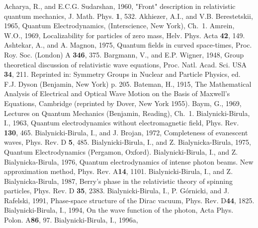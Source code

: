 \documentclass{article}
\begin{document}
\begin{thebibliography}{References}
 Acharya, R., and E.C.G.
Sudarshan, 1960, "Front" description in relativistic quantum mechanics, J.
Math. Phys. {\bf 1}, 532.
 Akhiezer, A.I., and V.B.
Berestetskii, 1965, Quantum Electrodynamics, (Interscience, New York),
Ch.~1.
 Amrein, W.O., 1969, Localizability for
particles of zero mass, Helv. Phys. Acta {\bf 42}, 149.
 Ashtekar, A., and A. Magnon,
1975, Quantum fields in curved space-times, Proc. Roy. Soc. (London) A{\bf
346}, 375.
 Bargmann, V., and E.P. Wigner,
1948, Group theoretical discussion of relativistic wave equations, Proc.
Natl. Acad. Sci. USA {\bf 34}, 211. Reprinted in: Symmetry Groups in Nuclear
and Particle Physics, ed. F.J. Dyson (Benjamin, New York) p. 205.
 Bateman, H., 1915, The Mathematical
Analysis of Electrical and Optical Wave Motion on the Basis of Maxwell's
Equations, Cambridge (reprinted by Dover, New York 1955).
 Baym, G., 1969, Lectures on Quantum
Mechanics (Benjamin, Reading), Ch.~1.
 Bialynicki-Birula, I., 1963,
Quantum electrodynamics without electromagnetic field, Phys. Rev. {\bf 130},
465.
 Bialynicki-Birula,
I., and J. Brojan, 1972, Completeness of evanescent waves, Phys. Rev. D{\bf
5}, 485.
Bialynicki-Birula, I., and Z. Bialynicka-Birula, 1975, Quantum
Electrodynamics (Pergamon, Oxford).
Bialynicki-Birula, I., and Z. Bialynicka-Birula, 1976, Quantum
electrodynamics of intense photon beams. New approximation method, Phys.
Rev. A{\bf 14}, 1101.
Bialynicki-Birula, I., and Z. Bialynicka-Birula, 1987, Berry's phase in the
relativistic theory of spinning particles, Phys. Rev. D {\bf 35}, 2383.
Bialynicki-Birula, I., P. G\'ornicki, and J. Rafelski, 1991, Phase-space
structure of the Dirac vacuum, Phys. Rev. D{\bf 44}, 1825.
 Bialynicki-Birula, I., 1994, On
the wave function of the photon, Acta Phys. Polon. A{\bf 86}, 97.
 Bialynicki-Birula, I., 1996a,

\end{thebibliography}
\end{document}
